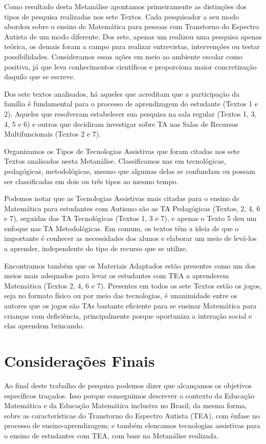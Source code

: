 \documentclass[portuguese]{textolivre}
\begin{document}
Como resultado desta Metanálise apontamos primeiramente as distinções
dos tipos de pesquisa realizadas nos sete Textos. Cada pesquisador a seu
modo abordou sobre o ensino de Matemática para pessoas com Transtorno do
Espectro Autista de um modo diferente. Dos sete, apenas um realizou uma
pesquisa apenas teórica, os demais foram a campo para realizar
entrevistas, intervenções ou testar possibilidades. Consideramos essas
ações em meio ao ambiente escolar como positiva, já que leva
conhecimentos científicos e proporciona maior concretização daquilo que
se escreve.

Dos sete textos analisados, há aqueles que acreditam que a participação
da família é fundamental para o processo de aprendizagem do estudante
(Textos 1 e 2). Aqueles que resolveram estabelecer sua pesquisa na sala
regular (Textos 1, 3, 4, 5 e 6) e outros que decidiram investigar sobre
TA nas Salas de Recursos Multifuncionais (Textos 2 e 7).

Organizamos os Tipos de Tecnologias Assistivas que foram citadas nos
sete Textos analisados nesta Metanálise. Classificamos nas em
tecnológicas, pedagógicas, metodológicas, mesmo que algumas delas se
confundam ou possam ser classificadas em dois ou três tipos ao mesmo
tempo.

Podemos notar que as Tecnologias Assistivas mais citadas para o ensino
de Matemática para estudantes com Autismo são as TA Pedagógicas (Textos,
2, 4, 6 e 7), seguidas das TA Tecnológicas (Textos 1, 3 e 7), e apenas o
Texto 5 deu um enfoque nas TA Metodológicas. Em comum, os textos têm a
ideia de que o importante é conhecer as necessidades dos alunos e
elaborar um meio de levá-los a aprender, independente do tipo de recurso
que se utilize.

Encontramos também que os Materiais Adaptados estão presentes como um
dos meios mais adequados para levar os estudantes com TEA a aprenderem
Matemática (Textos 2, 4, 6 e 7). Presentes em todos os sete Textos estão
os jogos, seja no formato físico ou por meio das tecnologias, é
unanimidade entre os autores que os jogos são TAs bastante eficiente
para se ensinar Matemática para crianças com deficiência, principalmente
porque oportuniza a interação social e elas aprendem brincando.




\section{Considerações Finais}
Ao final deste trabalho de pesquisa podemos dizer que alcançamos os
objetivos específicos traçados. Isso porque conseguimos descrever o
contexto da Educação Matemática e da Educação Matemática inclusiva no
Brasil; da mesma forma, sobre as características do Transtorno do
Espectro Autista (TEA), com ênfase no processo de ensino-aprendizagem; e
também elencamos tecnologias assistivas para o ensino de estudantes com
TEA, com base na Metanálise realizada.
\end{document}
